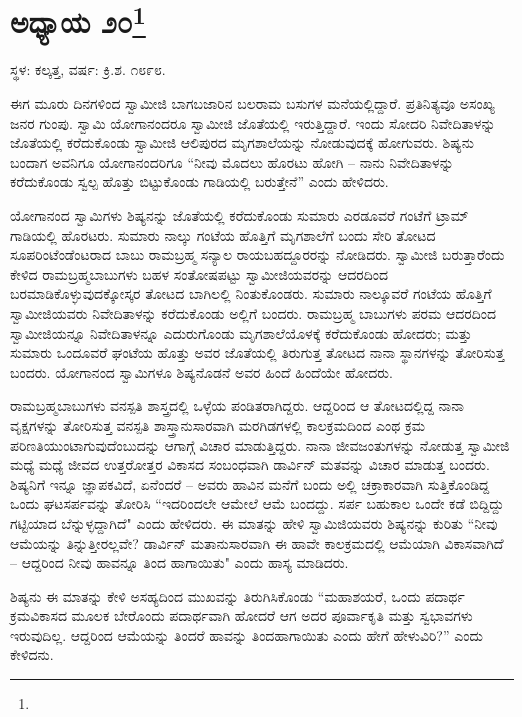 \newpage

\chapter[ಅಧ್ಯಾಯ ೨೦]{ಅಧ್ಯಾಯ ೨೦\protect\footnote{}}

\centerline{ಸ್ಥಳ: ಕಲ್ಕತ್ತ, ವರ್ಷ: ಕ್ರಿ.ಶ. ೧೮೯೮.}

ಈಗ ಮೂರು ದಿನಗಳಿಂದ ಸ್ವಾಮೀಜಿ ಬಾಗಬಜಾರಿನ ಬಲರಾಮ ಬಸುಗಳ ಮನೆಯಲ್ಲಿದ್ದಾರೆ. ಪ್ರತಿನಿತ್ಯವೂ ಅಸಂಖ್ಯ ಜನರ ಗುಂಪು. ಸ್ವಾಮಿ ಯೋಗಾನಂದರೂ ಸ್ವಾಮೀಜಿ ಜೊತೆಯಲ್ಲಿ ಇರುತ್ತಿದ್ದಾರೆ. ಇಂದು ಸೋದರಿ ನಿವೇದಿತಾಳನ್ನು ಜೊತೆಯಲ್ಲಿ ಕರೆದುಕೊಂಡು ಸ್ವಾಮೀಜಿ ಆಲಿಪುರದ ಮೃಗಶಾಲೆಯನ್ನು ನೋಡುವುದಕ್ಕೆ ಹೋಗುವರು. ಶಿಷ್ಯನು ಬಂದಾಗ ಅವನಿಗೂ ಯೋಗಾನಂದರಿಗೂ “ನೀವು ಮೊದಲು ಹೊರಟು ಹೋಗಿ – ನಾನು ನಿವೇದಿತಾಳನ್ನು ಕರೆದುಕೊಂಡು ಸ್ವಲ್ಪ ಹೊತ್ತು ಬಿಟ್ಟುಕೊಂಡು ಗಾಡಿಯಲ್ಲಿ ಬರುತ್ತೇನೆ” ಎಂದು ಹೇಳಿದರು.

ಯೋಗಾನಂದ ಸ್ವಾಮಿಗಳು ಶಿಷ್ಯನನ್ನು ಜೊತೆಯಲ್ಲಿ ಕರೆದುಕೊಂಡು ಸುಮಾರು ಎರಡೂವರೆ ಗಂಟೆಗೆ ಟ್ರಾಮ್ ಗಾಡಿಯಲ್ಲಿ ಹೊರಟರು. ಸುಮಾರು ನಾಲ್ಕು ಗಂಟೆಯ ಹೊತ್ತಿಗೆ ಮೃಗಶಾಲೆಗೆ ಬಂದು ಸೇರಿ ತೋಟದ ಸೂಪರಿಂಟೆಂಡೆಂಟರಾದ ಬಾಬು ರಾಮಬ್ರಹ್ಮ ಸನ್ಯಾಲ ರಾಯಬಹದ್ದೂರರನ್ನು ನೋಡಿದರು. ಸ್ವಾಮೀಜಿ ಬರುತ್ತಾರೆಂದು ಕೇಳಿದ ರಾಮಬ್ರಹ್ಮಬಾಬುಗಳು ಬಹಳ ಸಂತೋಷಪಟ್ಟು ಸ್ವಾಮೀಜಿಯವರನ್ನು ಆದರದಿಂದ ಬರಮಾಡಿಕೊಳ್ಳುವುದಕ್ಕೋಸ್ಕರ ತೋಟದ ಬಾಗಿಲಲ್ಲಿ ನಿಂತುಕೊಂಡರು. ಸುಮಾರು ನಾಲ್ಕೂವರೆ ಗಂಟೆಯ ಹೊತ್ತಿಗೆ ಸ್ವಾಮೀಜಿಯವರು ನಿವೇದಿತಾಳನ್ನು ಕರೆದುಕೊಂಡು ಅಲ್ಲಿಗೆ ಬಂದರು. ರಾಮಬ್ರಹ್ಮ ಬಾಬುಗಳು ಪರಮ ಆದರದಿಂದ ಸ್ವಾಮೀಜಿಯನ್ನೂ ನಿವೇದಿತಾಳನ್ನೂ ಎದುರುಗೊಂಡು ಮೃಗಶಾಲೆಯೊಳಕ್ಕೆ ಕರೆದುಕೊಂಡು ಹೋದರು; ಮತ್ತು ಸುಮಾರು ಒಂದೂವರೆ ಘಂಟೆಯ ಹೊತ್ತು ಅವರ ಜೊತೆಯಲ್ಲಿ ತಿರುಗುತ್ತ ತೋಟದ ನಾನಾ ಸ್ಥಾನಗಳನ್ನು ತೋರಿಸುತ್ತ ಬಂದರು. ಯೋಗಾನಂದ ಸ್ವಾಮಿಗಳೂ ಶಿಷ್ಯನೊಡನೆ ಅವರ ಹಿಂದೆ ಹಿಂದೆಯೇ ಹೋದರು.

ರಾಮಬ್ರಹ್ಮಬಾಬುಗಳು ವನಸ್ಪತಿ ಶಾಸ್ತ್ರದಲ್ಲಿ ಒಳ್ಳೆಯ ಪಂಡಿತರಾಗಿದ್ದರು. ಆದ್ದರಿಂದ ಆ ತೋಟದಲ್ಲಿದ್ದ ನಾನಾ ವೃಕ್ಷಗಳನ್ನು ತೋರಿಸುತ್ತ ವನಸ್ಪತಿ ಶಾಸ್ತ್ರಾನುಸಾರವಾಗಿ ಮರಗಿಡಗಳಲ್ಲಿ ಕಾಲಕ್ರಮದಿಂದ ಎಂಥ ಕ್ರಮ ಪರಿಣತಿಯುಂಟಾಗುವುದೆಂಬುದನ್ನು ಆಗಾಗ್ಗೆ ವಿಚಾರ ಮಾಡುತ್ತಿದ್ದರು. ನಾನಾ ಜೀವಜಂತುಗಳನ್ನು ನೋಡುತ್ತ ಸ್ವಾಮೀಜಿ ಮಧ್ಯೆ ಮಧ್ಯೆ ಜೀವದ ಉತ್ತರೋತ್ತರ ವಿಕಾಸದ ಸಂಬಂಧವಾಗಿ ಡಾರ್ವಿನ್ ಮತವನ್ನು ವಿಚಾರ ಮಾಡುತ್ತ ಬಂದರು. ಶಿಷ್ಯನಿಗೆ ಇನ್ನೂ ಜ್ಞಾಪಕವಿದೆ, ಏನೆಂದರೆ – ಅವರು ಹಾವಿನ ಮನೆಗೆ ಬಂದು ಅಲ್ಲಿ ಚಕ್ರಾಕಾರವಾಗಿ ಸುತ್ತಿಕೊಂಡಿದ್ದ ಒಂದು ಘಟಸರ್ಪವನ್ನು ತೋರಿಸಿ “ಇದರಿಂದಲೇ ಆಮೇಲೆ ಆಮೆ ಬಂದದ್ದು. ಸರ್ಪ ಬಹುಕಾಲ ಒಂದೇ ಕಡೆ ಬಿದ್ದಿದ್ದು ಗಟ್ಟಿಯಾದ ಬೆನ್ನುಳ್ಳದ್ದಾಗಿದೆ" ಎಂದು ಹೇಳಿದರು. ಈ ಮಾತನ್ನು ಹೇಳಿ ಸ್ವಾಮಿಜಿಯವರು ಶಿಷ್ಯನನ್ನು ಕುರಿತು “ನೀವು ಆಮೆಯನ್ನು ತಿನ್ನುತ್ತೀರಲ್ಲವೇ? ಡಾರ್ವಿನ್ ಮತಾನುಸಾರವಾಗಿ ಈ ಹಾವೇ ಕಾಲಕ್ರಮದಲ್ಲಿ ಆಮೆಯಾಗಿ ವಿಕಾಸವಾಗಿದೆ – ಆದ್ದರಿಂದ ನೀವು ಹಾವನ್ನೂ ತಿಂದ ಹಾಗಾಯಿತು" ಎಂದು ಹಾಸ್ಯ ಮಾಡಿದರು.

ಶಿಷ್ಯನು ಈ ಮಾತನ್ನು ಕೇಳಿ ಅಸಹ್ಯದಿಂದ ಮುಖವನ್ನು ತಿರುಗಿಸಿಕೊಂಡು “ಮಹಾಶಯರೆ, ಒಂದು ಪದಾರ್ಥ ಕ್ರಮವಿಕಾಸದ ಮೂಲಕ ಬೇರೊಂದು ಪದಾರ್ಥವಾಗಿ ಹೋದರೆ ಆಗ ಅದರ ಪೂರ್ವಾಕೃತಿ ಮತ್ತು ಸ್ವಭಾವಗಳು ಇರುವುದಿಲ್ಲ. ಆದ್ದರಿಂದ ಆಮೆಯನ್ನು ತಿಂದರೆ ಹಾವನ್ನು ತಿಂದಹಾಗಾಯಿತು ಎಂದು ಹೇಗೆ ಹೇಳುವಿರಿ?” ಎಂದು ಕೇಳಿದನು.

